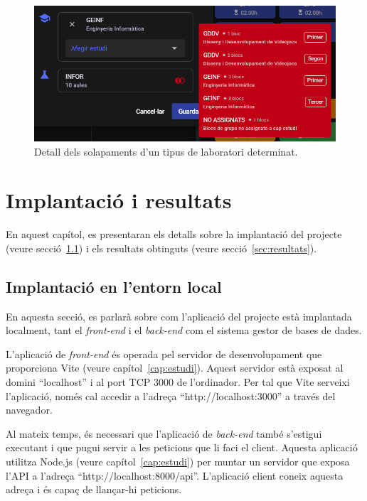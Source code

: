\documentclass[a4paper,12pt]{ThesisStyle}
\begin{document}
\begin{figure}[H]
  \centering
  \includegraphics[width=\textwidth]{assets/proves/solapaments.png}
  \caption{\label{img:solapaments} Detall dels solapaments d'un tipus de laboratori determinat.}
\end{figure}


\chapter{Implantació i resultats}
\label{cap:implantacio}

En aquest capítol, es presentaran els detalls sobre la implantació del projecte (veure secció~\ref{sec:implantacio}) i els resultats obtinguts (veure secció~\ref{sec:resultats}).

\section{Implantació en l'entorn local}
\label{sec:implantacio}

En aquesta secció, es parlarà sobre com l'aplicació del projecte està implantada localment, tant el \textit{front-end} i el \textit{back-end} com el sistema gestor de bases de dades.

L'aplicació de \textit{front-end} és operada pel servidor de desenvolupament que proporciona Vite (veure capítol~\ref{cap:estudi}). Aquest servidor està exposat al domini ``localhost'' i al port TCP 3000 de l'ordinador. Per tal que Vite serveixi l'aplicació, només cal accedir a l'adreça ``http://localhost:3000'' a través del navegador.

Al mateix temps, és necessari que l'aplicació de \textit{back-end} també s'estigui executant i que pugui servir a les peticions que li faci el client. Aquesta aplicació utilitza Node.js (veure capítol~\ref{cap:estudi}) per muntar un servidor que exposa l'API a l'adreça ``http://localhost:8000/api''. L'aplicació client coneix aquesta adreça i és capaç de llançar-hi peticions.
\end{document}
